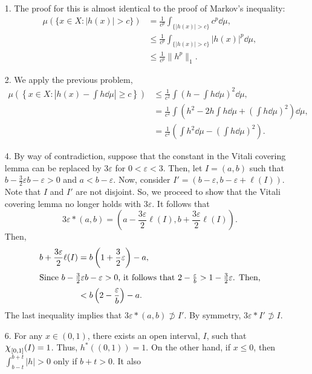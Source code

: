 \documentclass{article}
\newcommand{\eps}{\varepsilon}
\theoremstyle{remark}
\begin{document}
\thispagestyle{firstpage}
\begin{enumerate}[leftmargin=*]
    \item[1.] The proof for this is almost identical to the proof of Markov's
    inequality:
    \begin{align*}
        \mu(\{x \in X: |h(x)| > c\}) &= \frac{1}{c^p} \int_{\{|h(x)| > c\}} c^p \dd\mu, \\
        &\leq \frac{1}{c^p} \int_{\{|h(x)| > c\}} |h(x)|^p \dd\mu, \\
        &\leq \frac{1}{c^p} \| h^p\|_1.
    \end{align*}
    \item[2.] We apply the previous problem, 
    \begin{align*}
        \mu\left(\left\{x \in X : \left|h(x) - \int h\dd\mu\right| \geq c\right\}\right) &\leq \frac{1}{c^2} \int \left(h - \int h \dd\mu \right)^2 \dd\mu, \\
        &= \frac{1}{c^2}\int \left(h^2 - 2h\int h\dd\mu + \left(\int h\dd\mu\right)^2\right) \dd\mu, \\
        &= \frac{1}{c^2} \left(\int h^2 \dd\mu - \left(\int h \dd\mu\right)^2\right).
    \end{align*}
    \item[4.] By way of contradiction, suppose that the constant in the Vitali
    covering lemma can be replaced by $3\eps$ for $0 < \eps < 3$. Then, let $I =
    (a,b)$ such that $b - \frac{3}{2}\eps b - \eps > 0$ and $a < b - \eps$. Now,
    consider $I' = (b-\eps, b-\eps + \ell(I))$. Note that $I$ and $I'$ are not
    disjoint. So, we proceed to show that the Vitali covering lemma no longer
    holds with $3\eps$. It follows that 
    \[
        3\eps \ast (a,b) = \left(a - \frac{3\eps}{2}\ell(I), b + \frac{3\eps}{2}\ell(I)\right).    
    \]
    Then, 
    \begin{align*}
        b + \frac{3\eps}{2} \ell(I) &= b\left(1 + \frac{3}{2}\eps\right) - a, \\
        \intertext{Since $b - \frac{3}{2}\eps b - \eps > 0$, it follows that $2 - \frac{\eps}{b} > 1 - \frac{3}{2}\eps$. Then,}
        &< b\left(2 - \frac{\eps}{b}\right) - a.
    \end{align*}
    The last inequality implies that $3\eps \ast(a,b) \not \supset I'$. By
    symmetry, $3\eps \ast I' \not \supset I$. 
    \item[6.] For any $x \in (0,1)$, there exists an open interval, $I$, such
    that $\mbox{\large$\chi$}_{[0,1]}(I) = 1$. Thus, $h^\ast((0,1)) = 1$. On the other hand,
    if $x \leq 0$, then $\int_{b-t}^{b+t} |h| > 0$ only if $b+t > 0$. It also

\end{enumerate}
\end{document}
